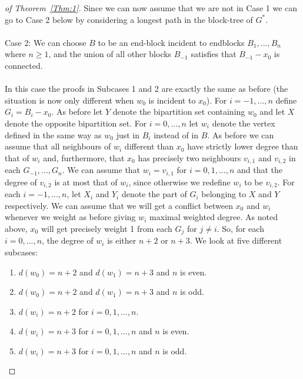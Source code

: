 \documentclass[
final,
 nomarks,
]{dmtcs-episciences}
\theoremstyle{definition}
\begin{document}
\begin{proof}[of Theorem~\ref{Thm:1}]
Since we can now assume that we are not in Case 1 we can go to Case 2 below by considering a longest path in the block-tree of $G^*$. \\ \\ 
Case 2: We can choose $B$ to be an end-block incident to endblocks $B_1,...,B_n$ where $n \geq 1$, and the union of all other blocks $B_{-1}$ satisfies that $B_{-1}-x_0$ is connected. \\ \\
In this case the proofs in Subcases 1 and 2 are exactly the same as before (the situation is now only different when $w_0$ is incident to $x_0$). For $i=-1,...,n$ define $G_i=B_i-x_0$. As before let $Y$ denote the bipartition set containing $w_0$ and let $X$ denote the opposite bipartition set. For $i=0,...,n$ let $w_i$ denote the vertex defined in the same way as $w_0$ just in $B_i$ instead of in $B$. As before we can assume that all neighbours of $w_i$ different than $x_0$ have strictly lower degree than that of $w_i$ and, furthermore, that $x_0$ has precisely two neighbours $v_{i,1}$ and $v_{i,2}$ in each $G_{-1},...,G_n$. We can assume that $w_i=v_{i,1}$ for $i=0,1,...,n$ and that the degree of $v_{i,2}$ is at most that of $w_i$, since otherwise we redefine $w_i$ to be $v_{i,2}$. For each $i=-1,...,n$, let $X_i$ and $Y_i$ denote the part of $G_i$ belonging to $X$ and $Y$ respectively. We can assume that we will get a conflict between $x_0$ and $w_i$ whenever we weight as before giving $w_i$ maximal weighted degree. As noted above, $x_0$ will get precisely weight 1 from each $G_j$ for $j \neq i$. So, for each $i=0,...,n$, the degree of $w_i$ is either $n+2$ or $n+3$.
We look at five different subcases:
\begin{enumerate}[label=(\alph*)]
\item $d(w_0)=n+2$ and $d(w_1)=n+3$ and $n$ is even.
\item $d(w_0)=n+2$ and $d(w_1)=n+3$ and $n$ is odd.
\item $d(w_i)=n+2$ for $i=0,1,...,n$.
\item $d(w_i)=n+3$ for $i=0,1,...,n$ and $n$ is even.
\item $d(w_i)=n+3$ for $i=0,1,...,n$ and $n$ is odd.
\end{enumerate}

\end{proof}
\end{document}
